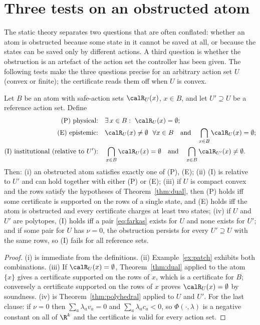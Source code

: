 \section{Three tests on an obstructed atom}\label{sec:taxonomy}

The static theory separates two questions that are often conflated: whether an atom is obstructed because some state in it cannot be saved at all, or because the states can be saved only by different actions. A third question is whether the obstruction is an artefact of the action set the controller has been given. The following tests make the three questions precise for an arbitrary action set $U$ (convex or finite); the certificate reads them off when $U$ is convex.

\begin{proposition}\label{prop:taxonomy}
Let $B$ be an atom with safe-action sets $\calR_U(x)$, $x\in B$, and let $U'\supseteq U$ be a reference action set. Define
\begin{align*}
\text{(P) physical:}\quad&\exists\,x\in B:\ \calR_U(x)=\emptyset;\\
\text{(E) epistemic:}\quad&\calR_U(x)\neq\emptyset\ \ \forall x\in B\quad\text{and}\quad\bigcap_{x\in B}\calR_U(x)=\emptyset;\\
\text{(I) institutional (relative to $U'$):}\quad&\bigcap_{x\in B}\calR_U(x)=\emptyset\quad\text{and}\quad\bigcap_{x\in B}\calR_{U'}(x)\neq\emptyset .
\end{align*}
Then: (i) an obstructed atom satisfies exactly one of (P), (E); (ii) (I) is relative to $U'$ and can hold together with either (P) or (E); (iii) if $U$ is compact convex and the rows satisfy the hypotheses of Theorem~\ref{thm:dual}, then (P) holds iff some certificate is supported on the rows of a single state, and (E) holds iff the atom is obstructed and every certificate charges at least two states; (iv) if $U$ and $U'$ are polytopes, (I) holds iff a pair \eqref{eq:farkas} exists for $U$ and none exists for $U'$; and if some pair for $U$ has $\nu=0$, the obstruction persists for every $U'\supseteq U$ with the same rows, so (I) fails for all reference sets.
\end{proposition}

\begin{proof}
(i) is immediate from the definitions. (ii) Example~\ref{ex:patch} exhibits both combinations. (iii) If $\calR_U(x)=\emptyset$, Theorem~\ref{thm:dual} applied to the atom $\{x\}$ gives a certificate supported on the rows of $x$, which is a certificate for $B$; conversely a certificate supported on the rows of $x$ proves $\calR_U(x)=\emptyset$ by soundness. (iv) is Theorem~\ref{thm:polyhedral} applied to $U$ and $U'$. For the last clause: if $\nu=0$ then $\sum_a\lambda_av_a=0$ and $\sum_a\lambda_ac_a<0$, so $\Phi(\cdot,\lambda)$ is a negative constant on all of $\R^k$ and the certificate is valid for every action set.
\end{proof}

